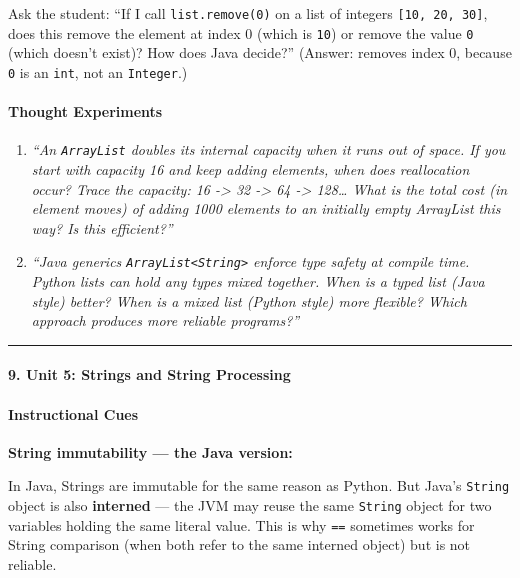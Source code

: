 \documentclass[
  justified,
  openright,
]{tufte-book}
\let\subsection\paragraph
\let\paragraph\paragraph
\let\subsection\paragraph
\let\paragraph\paragraph
\begin{document}
Ask the student: ``If I call \texttt{list.remove(0)} on a list of
integers \texttt{{[}10,\ 20,\ 30{]}}, does this remove the element at
index 0 (which is \texttt{10}) or remove the value \texttt{0} (which
doesn't exist)? How does Java decide?'' (Answer: removes index 0,
because \texttt{0} is an \texttt{int}, not an \texttt{Integer}.)

\paragraph{Thought Experiments}\label{thought-experiments-36}

\begin{enumerate}
\def\labelenumi{\arabic{enumi}.}
\item
  \emph{``An \texttt{ArrayList} doubles its internal capacity when it
  runs out of space. If you start with capacity 16 and keep adding
  elements, when does reallocation occur? Trace the capacity: 16
  -\textgreater{} 32 -\textgreater{} 64 -\textgreater{} 128\ldots{} What
  is the total cost (in element moves) of adding 1000 elements to an
  initially empty ArrayList this way? Is this efficient?''}
\item
  \emph{``Java generics
  \texttt{ArrayList\textless{}String\textgreater{}} enforce type safety
  at compile time. Python lists can hold any types mixed together. When
  is a typed list (Java style) better? When is a mixed list (Python
  style) more flexible? Which approach produces more reliable
  programs?''}
\end{enumerate}

\begin{center}\rule{0.5\linewidth}{0.5pt}\end{center}

\subsection{9. Unit 5: Strings and String
Processing}\label{unit-5-strings-and-string-processing}

\paragraph{Instructional Cues}\label{instructional-cues-28}

\textbf{String immutability --- the Java version:}

In Java, Strings are immutable for the same reason as Python. But Java's
\texttt{String} object is also \textbf{interned} --- the JVM may reuse
the same \texttt{String} object for two variables holding the same
literal value. This is why \texttt{==} sometimes works for String
comparison (when both refer to the same interned object) but is not
reliable.
\end{document}
